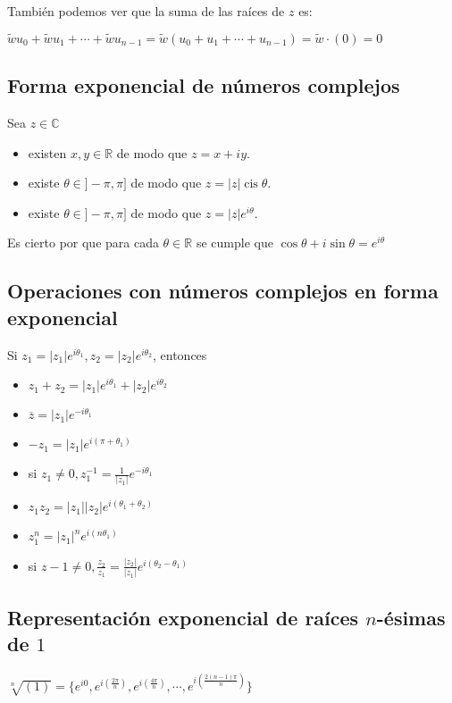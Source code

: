 \documentclass{article}
\DeclareMathOperator\cis{cis}
\begin{document}
También podemos ver que la suma de las raíces de $z$ es:
\begin{center}
    $\widetilde{w}u_0+\widetilde{w}u_1+\cdots +\widetilde{w}u_{n-1}=\widetilde{w}(u_0+u_1+\cdots+u_{n-1})=\widetilde{w}\cdot(0)=0$
\end{center}


\subsection{Forma exponencial de números complejos}
Sea $z\in \mathbb{C}$
\begin{itemize}
    \item existen $x,y\in \mathbb{R}$ de modo que $z=x+iy$.
    \item existe $\theta \in ]-\pi,\pi]$ de modo que $z=|z|\cis{\theta}$.
    \item existe $\theta \in ]-\pi,\pi]$ de modo que $z=|z|e^{i\theta}$.
\end{itemize}
Es cierto por que para cada $\theta\in \mathbb{R}$ se cumple que $\cos{\theta}+i\sin{\theta}=e^{i\theta}$ 

\subsection{Operaciones con números complejos en forma exponencial}
Si $z_1=|z_1|e^{i\theta_1},z_2=|z_2|e^{i\theta_2}$, entonces
\begin{itemize}
    \item $z_1+z_2=|z_1|e^{i\theta_1}+|z_2|e^{i\theta_2}$
    \item $\overline{z}=|z_1|e^{-i\theta_1}$
    \item $-z_1=|z_1|e^{i(\pi+\theta_1)}$
    \item si $z_1\ne 0, z_1^{-1}=\frac{1}{|z_1|}e^{-i\theta_1}$
    \item $z_1z_2=|z_1||z_2|e^{i(\theta_1+\theta_2)}$
    \item $z_{1}^{n}=|z_1|^ne^{i(n\theta_1)}$
    \item si $z-1\ne 0, \frac{z_2}{z_1}=\frac{|z_2|}{|z_1|}e^{i(\theta_2-\theta_1)}$
\end{itemize}

\subsection{Representación exponencial de raíces $n$-ésimas de $1$}
$\sqrt[n]{(1)}=\{ e^{i0},e^{i(\frac{2\pi}{n})},e^{i(\frac{4\pi}{n})},\cdots,e^{i(\frac{2(n-1)\pi}{n})} \}$
\end{document}
